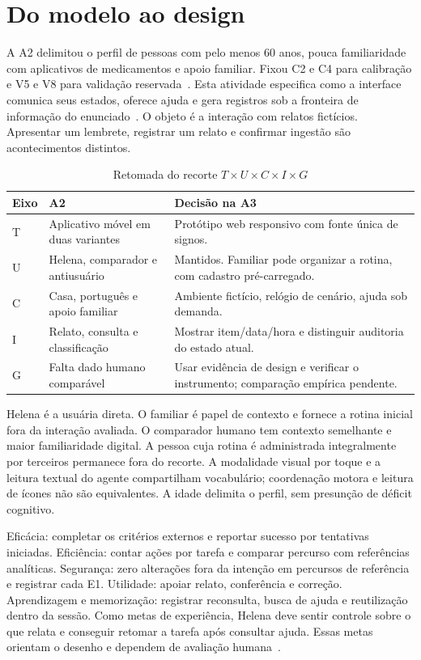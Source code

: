 \section{Do modelo ao design}
A A2 delimitou o perfil de pessoas com pelo menos 60 anos, pouca familiaridade com aplicativos de medicamentos e apoio familiar. Fixou C2 e C4 para calibração e V5 e V8 para validação reservada~\cite{a2}. Esta atividade especifica como a interface comunica seus estados, oferece ajuda e gera registros sob a fronteira de informação do enunciado~\cite{a3}. O objeto é a interação com relatos fictícios. Apresentar um lembrete, registrar um relato e confirmar ingestão são acontecimentos distintos.

\begin{table}[ht]
\caption{Retomada do recorte $T\times U\times C\times I\times G$}\label{tab:tucig}
\small\begin{tabularx}{\columnwidth}{@{}lYY@{}}\toprule
Eixo & A2 & Decisão na A3\\\midrule
T & Aplicativo móvel em duas variantes & Protótipo web responsivo com fonte única de signos.\\
U & Helena, comparador e antiusuário & Mantidos. Familiar pode organizar a rotina, com cadastro pré-carregado.\\
C & Casa, português e apoio familiar & Ambiente fictício, relógio de cenário, ajuda sob demanda.\\
I & Relato, consulta e classificação & Mostrar item/data/hora e distinguir auditoria do estado atual.\\
G & Falta dado humano comparável & Usar evidência de design e verificar o instrumento; comparação empírica pendente.\\\bottomrule
\end{tabularx}
\end{table}

Helena é a usuária direta. O familiar é papel de contexto e fornece a rotina inicial fora da interação avaliada. O comparador humano tem contexto semelhante e maior familiaridade digital. A pessoa cuja rotina é administrada integralmente por terceiros permanece fora do recorte. A modalidade visual por toque e a leitura textual do agente compartilham vocabulário; coordenação motora e leitura de ícones não são equivalentes. A idade delimita o perfil, sem presunção de déficit cognitivo.

 Eficácia: completar os critérios externos e reportar sucesso por tentativas iniciadas. Eficiência: contar ações por tarefa e comparar percurso com referências analíticas. Segurança: zero alterações fora da intenção em percursos de referência e registrar cada E1. Utilidade: apoiar relato, conferência e correção. Aprendizagem e memorização: registrar reconsulta, busca de ajuda e reutilização dentro da sessão. Como metas de experiência, Helena deve sentir controle sobre o que relata e conseguir retomar a tarefa após consultar ajuda. Essas metas orientam o desenho e dependem de avaliação humana~\cite[cap. 2]{preece}.

